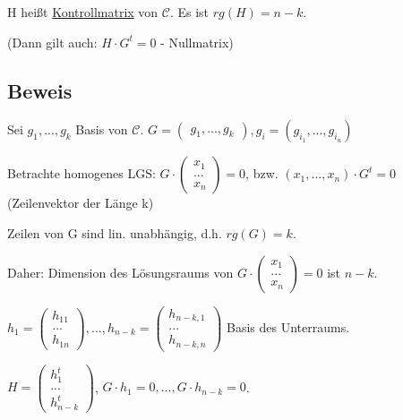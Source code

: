   H heißt \underline{Kontrollmatrix} von $\mathcal{C}$. Es ist $rg(H) = n-k$.

  (Dann gilt auch: $H \cdot G^t = 0$ - Nullmatrix)

  \subsection{Beweis}

  Sei $g_1, ..., g_k$ Basis von $\mathcal{C}$. $G = \begin{pmatrix}g_1, ..., g_k\end{pmatrix}, g_i = (g_{i_1}, ..., g_{i_n})$

  \par \medskip

  Betrachte homogenes LGS: $G \cdot \begin{pmatrix}x_1 \\ ... \\ x_n \end{pmatrix} = 0$, bzw. $(x_1, ..., x_n) \cdot G^t = 0$ (Zeilenvektor der Länge k)

  Zeilen von G sind lin. unabhängig, d.h. $rg(G) = k$.

  \par \medskip

  Daher: Dimension des Lösungsraums von $G \cdot \begin{pmatrix}x_1 \\ ... \\ x_n \end{pmatrix} = 0$ ist $n-k$.

  $h_1 = \begin{pmatrix}h_{11} \\ ... \\ h_{1n} \end{pmatrix}, ..., h_{n-k} = \begin{pmatrix}h_{n-k, 1} \\ ... \\ h_{n-k, n} \end{pmatrix}$ Basis des Unterraums. 

  \par \medskip

  $H = \begin{pmatrix}h_1^t \\ ... \\ h_{n-k}^t \end{pmatrix}$, $G \cdot h_1 = 0, ..., G \cdot h_{n-k} = 0$.

  \par \medskip

